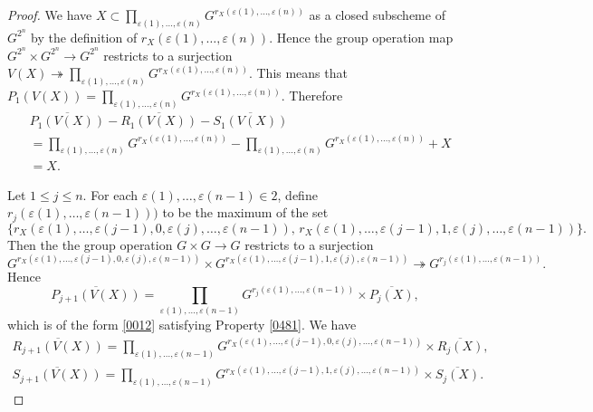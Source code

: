 \documentclass{amsart}
\theoremstyle{remark}
\numberwithin{equation}{subsection}
\newcommand{\onto}{\twoheadrightarrow}
\newcommand{\closure}[1]{\overline{#1}}
\begin{document}
\begin{proof}
	We have
		$
				X
			\subset
				\prod_{\varepsilon(1), \dots, \varepsilon(n)}
					G^{r_{X}(\varepsilon(1), \dots, \varepsilon(n))}
		$
	as a closed subscheme of $G^{2^{n}}$
	by the definition of $r_{X}(\varepsilon(1), \dots, \varepsilon(n))$.
	Hence the group operation map
	$G^{2^{n}} \times G^{2^{n}} \to G^{2^{n}}$
	restricts to a surjection
		$
				V(X)
			\onto
				\prod_{\varepsilon(1), \dots, \varepsilon(n)}
					G^{r_{X}(\varepsilon(1), \dots, \varepsilon(n))}
		$.
	This means that
		$
				P_{1}(V(X))
			=
				\prod_{\varepsilon(1), \dots, \varepsilon(n)}
					G^{r_{X}(\varepsilon(1), \dots, \varepsilon(n))}
		$.
	Therefore
		\begin{align*}
		&		\closure{P_{1}(V(X))} - \closure{R_{1}(V(X))} - \closure{S_{1}(V(X))}
		\\
		&	=
					\prod_{\varepsilon(1), \dots, \varepsilon(n)}
						G^{r_{X}(\varepsilon(1), \dots, \varepsilon(n))}
				-
					\prod_{\varepsilon(1), \dots, \varepsilon(n)}
						G^{r_{X}(\varepsilon(1), \dots, \varepsilon(n))}
				+
					X
		\\
		&	=
				X.
		\end{align*}
	
	Let $1 \le j \le n$.
	For each $\varepsilon(1), \dots, \varepsilon(n - 1) \in 2$,
	define $r_{j}(\varepsilon(1), \dots, \varepsilon(n - 1)))$ to be
	the maximum of the set
		\[
			\bigl\{
				r_{X}(\varepsilon(1), \dots, \varepsilon(j - 1), 0, \varepsilon(j), \dots, \varepsilon(n - 1)),\,
				r_{X}(\varepsilon(1), \dots, \varepsilon(j - 1), 1, \varepsilon(j), \dots, \varepsilon(n - 1))
			\bigr\}.
		\]
	Then the the group operation $G \times G \to G$
	restricts to a surjection
		\[
					G^{r_{X}(\varepsilon(1), \dots, \varepsilon(j - 1), 0, \varepsilon(j), \varepsilon(n - 1))}
				\times
					G^{r_{X}(\varepsilon(1), \dots, \varepsilon(j - 1), 1, \varepsilon(j), \varepsilon(n - 1))}
			\onto
				G^{r_{j}(\varepsilon(1), \dots, \varepsilon(n - 1))}.
		\]
	Hence
		\[
				\closure{P_{j + 1}(V(X))}
			=
					\prod_{\varepsilon(1), \dots, \varepsilon(n - 1)}
						G^{r_{j}(\varepsilon(1), \dots, \varepsilon(n - 1))}
				\times
					\closure{P_{j}(X)},
		\]
	which is of the form \eqref{0012} satisfying Property \eqref{0481}.
	We have
		\begin{gather*}
					\closure{R_{j + 1}(V(X))}
				=
						\prod_{\varepsilon(1), \dots, \varepsilon(n - 1)}
							G^{r_{X}(\varepsilon(1), \dots, \varepsilon(j - 1), 0, \varepsilon(j), \dots, \varepsilon(n - 1))}
					\times
						\closure{R_{j}(X)},
			\\
					\closure{S_{j + 1}(V(X))}
				=
						\prod_{\varepsilon(1), \dots, \varepsilon(n - 1)}
							G^{r_{X}(\varepsilon(1), \dots, \varepsilon(j - 1), 1, \varepsilon(j), \dots, \varepsilon(n - 1))}
					\times
						\closure{S_{j}(X)}.
		\end{gather*}
	

\end{proof}
\end{document}
